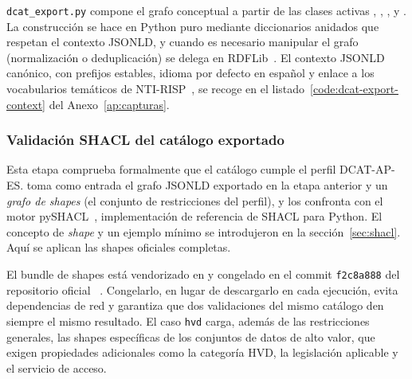 \texttt{dcat\_export.py} compone el grafo conceptual a partir de las clases activas , , ,  y . La construcción se hace en Python puro mediante diccionarios anidados que respetan el contexto \ac{JSONLD}, y cuando es necesario manipular el grafo (normalización o deduplicación) se delega en RDFLib~\cite{rdflib}. El contexto \ac{JSONLD} canónico, con prefijos estables, idioma por defecto en español y enlace a los vocabularios temáticos de NTI-RISP~\cite{datosGobNtiRisp}, se recoge en el listado~\ref{code:dcat-export-context} del Anexo~\ref{ap:capturas}.

\subsubsection{Validación SHACL del catálogo exportado}

Esta etapa comprueba formalmente que el catálogo cumple el perfil DCAT-AP-ES.  toma como entrada el grafo \ac{JSONLD} exportado en la etapa anterior y un \emph{grafo de shapes} (el conjunto de restricciones del perfil), y los confronta con el motor pySHACL~\cite{pyshacl}, implementación de referencia de \ac{SHACL} para Python. El concepto de \emph{shape} y un ejemplo mínimo se introdujeron en la sección~\ref{sec:shacl}. Aquí se aplican las shapes oficiales completas.

El bundle de shapes está vendorizado en  y congelado en el commit \texttt{f2c8a888} del repositorio oficial ~\cite{datosGobValidacionDcatApEs2025}. Congelarlo, en lugar de descargarlo en cada ejecución, evita dependencias de red y garantiza que dos validaciones del mismo catálogo den siempre el mismo resultado. El caso \texttt{hvd} carga, además de las restricciones generales, las shapes específicas de los conjuntos de datos de alto valor, que exigen propiedades adicionales como la categoría HVD, la legislación aplicable y el servicio de acceso.

